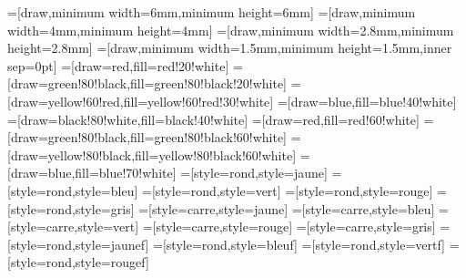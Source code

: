 =[draw,minimum width=6mm,minimum height=6mm]
=[draw,minimum width=4mm,minimum height=4mm]
=[draw,minimum width=2.8mm,minimum height=2.8mm]
=[draw,minimum width=1.5mm,minimum height=1.5mm,inner sep=0pt]
%
=[draw=red,fill=red!20!white]
=[draw=green!80!black,fill=green!80!black!20!white]
=[draw=yellow!60!red,fill=yellow!60!red!30!white]
=[draw=blue,fill=blue!40!white]
=[draw=black!80!white,fill=black!40!white]
%
=[draw=red,fill=red!60!white]
=[draw=green!80!black,fill=green!80!black!60!white]
=[draw=yellow!80!black,fill=yellow!80!black!60!white]
=[draw=blue,fill=blue!70!white]
%
=[style=rond,style=jaune]
=[style=rond,style=bleu]
=[style=rond,style=vert]
=[style=rond,style=rouge]
=[style=rond,style=gris]
%
=[style=carre,style=jaune]
=[style=carre,style=bleu]
=[style=carre,style=vert]
=[style=carre,style=rouge]
=[style=carre,style=gris]
%
=[style=rond,style=jaunef]
=[style=rond,style=bleuf]
=[style=rond,style=vertf]
=[style=rond,style=rougef]

\usetikzlibrary{shadows}

\usetikzlibrary{hobby,backgrounds,calc,trees}

\usepackage{tikz-cd}
\usetikzlibrary{matrix}
\usepackage{stmaryrd}
\usepackage{stackengine}
\usepackage{xspace}
\usepackage{xcolor}
\usepackage[linesnumbered,ruled,vlined]{algorithm2e}
\newcommand\mycommfont[1]{\footnotesize\ttfamily\textcolor{blue}{#1}}
\renewcommand*{\algorithmcfname}{Procedure}
\renewcommand*{\algorithmautorefname}{procedure}
\newtheorem{fact}{Fact}
